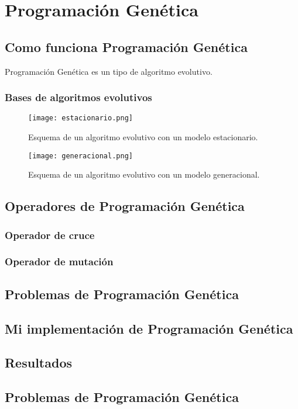 \section{Programación Genética}

\subsection{Como funciona Programación Genética}

Programación Genética es un tipo de algoritmo evolutivo.

\subsubsection{Bases de algoritmos evolutivos}

\begin{figure}[H]
    \centering
	  \texttt{[image: estacionario.png]}
     \label{fig:modelo_estacionario}
    \caption{Esquema de un algoritmo evolutivo con un modelo estacionario.}

\end{figure}

\begin{figure}[H]
    \centering
	  \texttt{[image: generacional.png]}
     \label{fig:modelo_generacioal}
    \caption{Esquema de un algoritmo evolutivo con un modelo generacional.}
\end{figure}

\subsection{Operadores de Programación Genética}

\subsubsection{Operador de cruce}

\subsubsection{Operador de mutación}


\subsection{Problemas de Programación Genética}

\subsection{Mi implementación de Programación Genética}

\subsection{Resultados}

\subsection{Problemas de Programación Genética}
